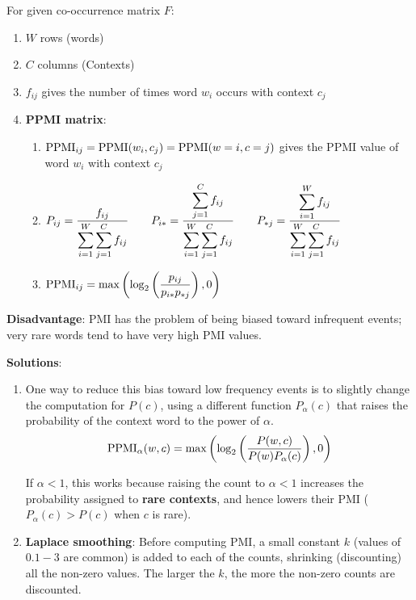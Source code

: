 For given co-occurrence matrix $F$:
\begin{enumerate}
    \item $W$ rows (words)
    \item $C$ columns (Contexts)
    \item $f_{ij}$ gives the number of times word $w_i$ occurs with context $c_j$
    \item \textbf{PPMI matrix}: 
    \begin{enumerate}
        \item $\operatorname{PPMI}_{ij} = \operatorname{PPMI}(w_i, c_j) = \operatorname{PPMI}(w = i, c = j)$ gives the PPMI value of word $w_i$ with context $c_j$
        
        \item \( \displaystyle P_{ij}=\dfrac{f_{ij}}{\displaystyle\sum_{i=1}^{W} \sum_{j=1}^{C} f_{ij}}  \quad\quad P_{i*}=\dfrac{\displaystyle\sum_{j=1}^{C} f_{ij}}{\displaystyle\sum_{i=1}^{W} \sum_{j=1}^{C} f_{ij}} \quad\quad P_{*j}=\dfrac{\displaystyle\sum_{i=1}^{W} f_{ij}}{\displaystyle\sum_{i=1}^{W} \sum_{j=1}^{C} f_{ij}} \)
        
        \item \( \displaystyle \operatorname{PPMI}_{ij} = \max\left( \log_2\left( \dfrac{p_{ij}}{p_{i*}p_{*j}} \right),0\right) \)
        
    \end{enumerate}
\end{enumerate}

\vspace{0.2cm}
\textbf{Disadvantage}: PMI has the problem of being biased toward infrequent events; very rare words tend to have very high PMI values.

\textbf{Solutions}:
\begin{enumerate}
    \item One way to reduce this bias toward low frequency events is to slightly change the computation for $P(c)$, using a different function $P_\alpha(c)$ that raises the probability of the context word to the power of $\alpha$.
    \[
        \displaystyle \operatorname{PPMI}_\alpha(w, c) = \max\left(\log_2\left(\dfrac{P(w, c)}{P(w)P_\alpha(c)}\right),0\right)
    \]    
    
    If $\alpha < 1$, this works because raising the count to $\alpha < 1$ increases the probability assigned to \textbf{rare contexts}, and hence lowers their PMI ($P_\alpha(c) > P(c)$ when $c$ is rare).

    \item \textbf{Laplace smoothing}: Before computing PMI, a small constant $k$ (values of $0.1-3$ are common) is added to each of the counts, shrinking (discounting) all the non-zero values. The larger the $k$, the more the non-zero counts are discounted.
    
\end{enumerate}

